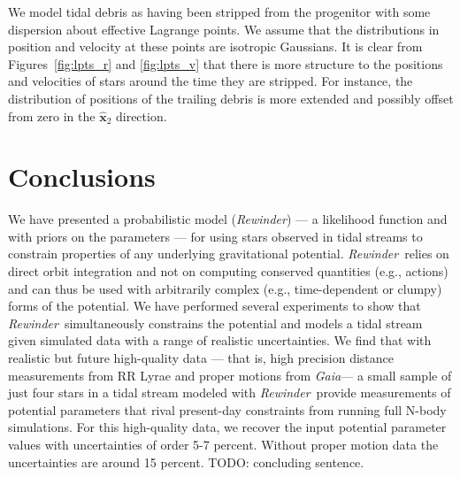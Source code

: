 \documentclass[letterpaper,12pt,preprint]{aastex}
\newcommand{\project}[1]{\textsl{#1}}
\newcommand{\gaia}{\project{Gaia}}
\newcommand{\bs}{\boldsymbol}
\newcommand{\rewinder}{\emph{Rewinder}}
\begin{document}
We model tidal debris as having been stripped from the progenitor with some dispersion about effective Lagrange points. We assume that the distributions in position and velocity at these points are isotropic Gaussians. It is clear from Figures~\ref{fig:lpts_r} and \ref{fig:lpts_v} that there is more structure to the positions and velocities of stars around the time they are stripped. For instance, the distribution of positions of the trailing debris is more extended and possibly offset from zero in the $\hat{\bs{x}}_2$ direction. 
  


\section{Conclusions}\label{sec:conclusion}
We have presented a probabilistic model (\rewinder) --- a likelihood function and with priors on the parameters --- for using stars observed in tidal streams to constrain properties of any underlying gravitational potential. \rewinder\ relies on direct orbit integration and not on computing conserved quantities (e.g., actions) and can thus be used with arbitrarily complex (e.g., time-dependent or clumpy) forms of the potential. We have performed several experiments to show that \rewinder\ simultaneously constrains the potential and models a tidal stream given simulated data with a range of realistic uncertainties. We find that with realistic but future high-quality data --- that is, high precision distance measurements from RR Lyrae and proper motions from \gaia --- a small sample of just four stars in a tidal stream modeled with \rewinder\, provide measurements of potential parameters that rival present-day constraints from running full N-body simulations. For this high-quality data, we recover the input potential parameter values with uncertainties of order 5-7 percent. Without proper motion data the uncertainties are around 15 percent. TODO: concluding sentence.
\end{document}
